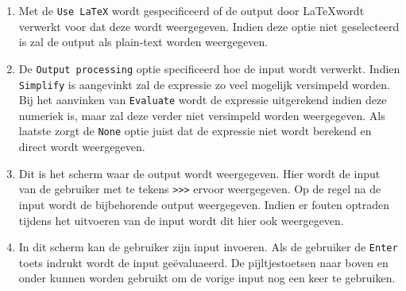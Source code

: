 \documentclass[a4paper]{article}
\begin{document}
\begin{enumerate}
\item Met de \texttt{Use LaTeX} wordt gespecificeerd of de output door \LaTeX wordt verwerkt voor dat deze wordt weergegeven. Indien deze optie niet geselecteerd is zal de output als plain-text worden weergegeven.
\item De \texttt{Output processing} optie specificeerd hoe de input wordt verwerkt. Indien \texttt{Simplify} is aangevinkt zal de expressie zo veel mogelijk versimpeld worden. Bij het aanvinken van \texttt{Evaluate} wordt de expressie uitgerekend indien deze numeriek is, maar zal deze verder niet versimpeld worden weergegeven. Als laatste zorgt de \texttt{None} optie juist dat de expressie niet wordt berekend en direct wordt weergegeven.
\item Dit is het scherm waar de output wordt weergegeven. Hier wordt de input van de gebruiker met te tekens \texttt{>>>} ervoor weergegeven. Op de regel na de input wordt de bijbehorende output weergegeven. Indien er fouten optraden tijdens het uitvoeren van de input wordt dit hier ook weergegeven.
\item In dit scherm kan de gebruiker zijn input invoeren. Als de gebruiker de \texttt{Enter} toets indrukt wordt de input ge\"evaluaeerd. De pijltjestoetsen naar boven en onder kunnen worden gebruikt om de vorige input nog een keer te gebruiken.
\end{enumerate}
\end{document}
